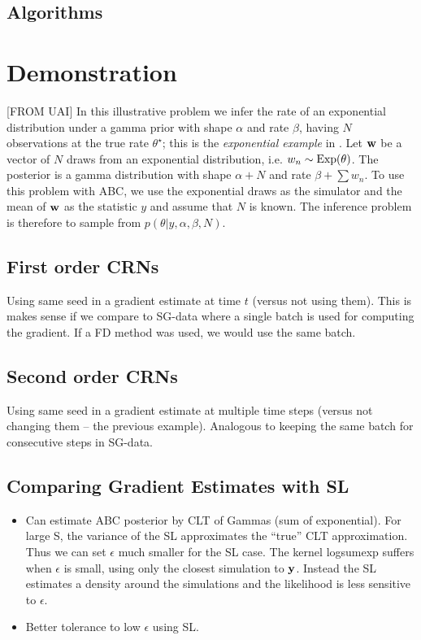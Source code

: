 \documentclass[]{article}
\begin{document}
  

\subsection{Algorithms}


\section{Demonstration}\label{sec:demo}
[FROM UAI] In this illustrative problem we infer the rate of an exponential distribution under a gamma prior with shape $\alpha$ and rate $\beta$, having $N$ observations at the true rate $\theta^{\star}$; this is the {\em exponential example} in \cite{turner2012tutorial}.  Let ${\bf w}$ be a vector of $N$ draws from an exponential distribution, i.e. $w_n \sim \operatorname{Exp}(\theta)$.  The posterior is a gamma distribution with shape $\alpha+N$ and rate $\beta + \sum w_n$.  To use this problem with ABC, we use the exponential draws as the simulator and the mean of ${\bf w}$ as the statistic $y$ and assume that $N$ is known.  The inference problem is therefore to sample from $p( \theta | y, \alpha, \beta, N )$.

\subsection{First order CRNs}
Using same seed in a gradient estimate at time $t$ (versus not using them).  This is makes sense if we compare to SG-data where a single batch is used for computing the gradient.  If a FD method was used, we would use the same batch.

\subsection{Second order CRNs}
Using same seed in a gradient estimate at multiple time steps (versus not changing them -- the previous example).  Analogous to keeping the same batch for consecutive steps in SG-data.

\subsection{Comparing Gradient Estimates with SL}
\begin{itemize}
  \item Can estimate ABC posterior by CLT of Gammas (sum of exponential).  For large S, the variance of the SL approximates the ``true'' CLT approximation.  Thus we can set $\epsilon$ much smaller for the SL case.  The kernel logsumexp suffers when $\epsilon$ is small, using only the closest simulation to ${\bf y}$.  Instead the SL estimates a density around the simulations and the likelihood is less sensitive to $\epsilon$.
  \item Better tolerance to low $\epsilon$ using SL.
\end{itemize}
\end{document}

